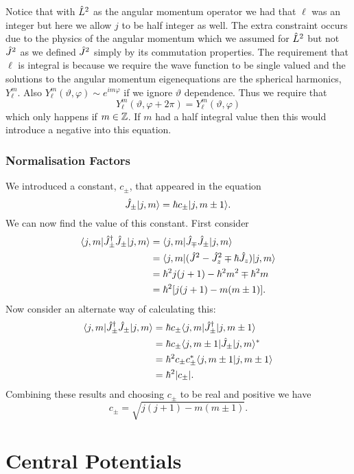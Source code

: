 Notice that with \(\hat{L}^2\) as the angular momentum operator we had that \(\ell\) was an integer but here we allow \(j\) to be half integer as well.
The extra constraint occurs due to the physics of the angular momentum which we assumed for \(\hat{L}^2\) but not \(\hat{J}^2\) as we defined \(\hat{J}^2\) simply by its commutation properties.
The requirement that \(\ell\) is integral is because we require the wave function to be single valued and the solutions to the angular momentum eigenequations are the spherical harmonics, \(Y_\ell^m\).
Also \(Y_\ell^m(\vartheta, \varphi) \sim e^{im\varphi}\) if we ignore \(\vartheta\) dependence.
Thus we require that
\[Y_\ell^m(\vartheta, \varphi + 2\pi) = Y_\ell^m(\vartheta, \varphi)\]
which only happens if \(m\in\mathbb{Z}\).
If \(m\) had a half integral value then this would introduce a negative into this equation.

\subsubsection{Normalisation Factors}
We introduced a constant, \(c_{\pm}\), that appeared in the equation
\[\hat{J}_{\pm}\vert {j, m} \rangle = \hbar c_{\pm}\vert {j, m \pm 1} \rangle.\]
We can now find the value of this constant.
First consider
\begin{align*}
    \langle {j, m} \vert\hat{J}_{\pm}^\dagger\hat{J}_{\pm}\vert {j, m} \rangle &= \langle {j, m} \vert\hat{J}_{\mp}\hat{J}_{\pm}\vert {j, m} \rangle\\
    &= \langle {j, m} \vert(\hat{J}^2 - \hat{J}_z^2 \mp \hbar\hat{J}_z)\vert {j, m} \rangle\\
    &= \hbar^2j(j + 1) - \hbar^2m^2 \mp \hbar^2m\\
    &= \hbar^2[j(j+1) - m(m\pm 1)].
\end{align*}
Now consider an alternate way of calculating this:
\begin{align*}
    \langle {j, m} \vert\hat{J}_{\pm}^\dagger\hat{J}_{\pm}\vert {j, m} \rangle &= \hbar c_{\pm}\langle {j, m} \vert\hat{J}_{\pm}^\dagger\vert {j, m \pm 1} \rangle\\
    &= \hbar c_{\pm}\langle {j, m\pm 1} \vert\hat{J}_{\pm}\vert {j, m} \rangle^*\\
    &= \hbar^2 c_{\pm}c_{\pm}^*\langle {j, m\pm 1} \vert {j, m\pm 1} \rangle\\
    &= \hbar^2\abs{c_{\pm}}.
\end{align*}
Combining these results and choosing \(c_{\pm}\) to be real and positive we have
\[c_{\pm} = \sqrt{j(j + 1) - m(m \pm 1)}.\]

\section{Central Potentials}
